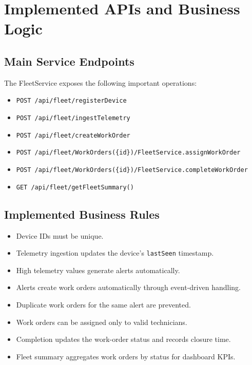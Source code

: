 \documentclass[a4paper,12pt]{article}
\begin{document}
\section{Implemented APIs and Business Logic}

\subsection{Main Service Endpoints}

The FleetService exposes the following important operations:

\begin{itemize}[leftmargin=1.5em, itemsep=3pt]
  \item \texttt{POST /api/fleet/registerDevice}
  \item \texttt{POST /api/fleet/ingestTelemetry}
  \item \texttt{POST /api/fleet/createWorkOrder}
  \item \texttt{POST /api/fleet/WorkOrders(\{id\})/FleetService.assignWorkOrder}
  \item \texttt{POST /api/fleet/WorkOrders(\{id\})/FleetService.completeWorkOrder}
  \item \texttt{GET /api/fleet/getFleetSummary()}
\end{itemize}

\subsection{Implemented Business Rules}

\begin{itemize}[leftmargin=1.5em, itemsep=4pt]
  \item Device IDs must be unique.
  \item Telemetry ingestion updates the device's \texttt{lastSeen} timestamp.
  \item High telemetry values generate alerts automatically.
  \item Alerts create work orders automatically through event-driven handling.
  \item Duplicate work orders for the same alert are prevented.
  \item Work orders can be assigned only to valid technicians.
  \item Completion updates the work-order status and records closure time.
  \item Fleet summary aggregates work orders by status for dashboard KPIs.
\end{itemize}
\end{document}
